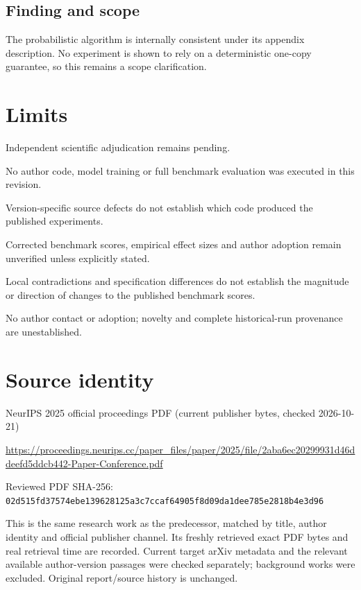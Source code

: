 \documentclass[11pt]{article}
\begin{document}
\subsection*{Finding and scope}

The probabilistic algorithm is internally consistent under its appendix description. No experiment is shown to rely on a deterministic one-copy guarantee, so this remains a scope clarification.

\section*{Limits}

Independent scientific adjudication remains pending.\par

No author code, model training or full benchmark evaluation was executed in this revision.\par

Version-specific source defects do not establish which code produced the published experiments.\par

Corrected benchmark scores, empirical effect sizes and author adoption remain unverified unless explicitly stated.\par

Local contradictions and specification differences do not establish the magnitude or direction of changes to the published benchmark scores.\par

No author contact or adoption; novelty and complete historical-run provenance are unestablished.\par

\section*{Source identity}

NeurIPS 2025 official proceedings PDF (current publisher bytes, checked 2026-10-21)

\url{https://proceedings.neurips.cc/paper_files/paper/2025/file/2aba6ec20299931d46ddeefd5ddcb442-Paper-Conference.pdf}

Reviewed PDF SHA-256: \nolinkurl{02d515fd37574ebe139628125a3c7ccaf64905f8d09da1dee785e2818b4e3d96}

This is the same research work as the predecessor, matched by title, author identity and official publisher channel. Its freshly retrieved exact PDF bytes and real retrieval time are recorded. Current target arXiv metadata and the relevant available author-version passages were checked separately; background works were excluded. Original report/source history is unchanged.
\end{document}
